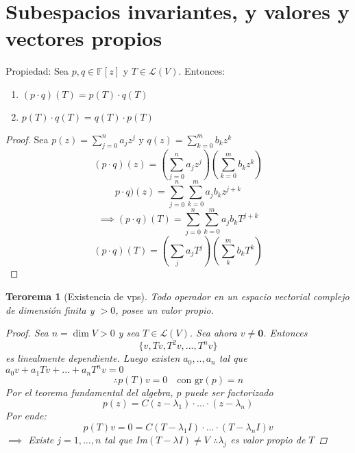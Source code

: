 \documentclass[11pt]{book}
\renewcommand{\vec}[1]{\mathbf{#1}}
\newcommand{\set}[1]{\mathbb{#1}}
\newtheorem{thm}{Terorema}[section]
\theoremstyle{definition}
\begin{document}
\section{Subespacios invariantes, y valores y vectores propios}
Propiedad: Sea $p,q\in\set{F}[z]$ y $T\in\mathcal{L}(V)$. Entonces:
\begin{enumerate}
	\item $(p\cdot q)(T)=p(T)\cdot q(T)$
	
	\item $p(T)\cdot q(T)=q(T)\cdot p(T)$
\end{enumerate}
\begin{proof}
	Sea $p(z)=\sum^n_{j=0}a_jz^j$ y $q(z)=\sum^m_{k=0}b_kz^k$
	\[(p\cdot q)(z)=\left(\sum^n_{j=0}a_jz^j\right)\left(\sum^m_{k=0}b_kz^k\right)\]
	\[p\cdot q)(z)=\sum^n_{j=0}\sum^m_{k=0}a_jb_kz^{j+k}\]
	\[\implies (p\cdot q)(T)=\sum^n_{j=0}\sum^m_{k=0}a_jb_kT^{j+k}\]
	\[(p\cdot q)(T)=(\sum_ja_jT^j)(\sum^m_kb_kT^k)\]
\end{proof}
\begin{thm}[Existencia de vps]
	Todo operador en un espacio vectorial complejo de dimensión finita y $>0$, posee un valor propio.
	\begin{proof}
		Sea $n=\dim V>0$ y sea $T\in\mathcal{L}(V)$. Sea ahora $v\neq\vec{0}$. Entonces
		\[\{v,Tv,T^2v,...,T^nv\}\]
		es linealmente dependiente. Luego existen $a_0,..,a_n$ tal que $a_0v+a_1Tv+...+a_nT^nv=0$
		\[\therefore p(T)v=0\quad\textrm{con gr$(p)=n$}\]
		Por el teorema fundamental del algebra, $p$ puede ser factorizado
		\[p(z)=C(z-\lambda_1)\cdot...\cdot(z-\lambda_n)\]
		Por ende:
		\[p(T)v=0=C(T-\lambda_1 I)\cdot...\cdot(T-\lambda_n I)v\]
		$\implies$ Existe $j=1,...,n$ tal que Im$(T-\lambda I)\neq V$
		$\therefore\lambda_j$ es valor propio de $T$
	\end{proof}
\end{thm}
\end{document}
